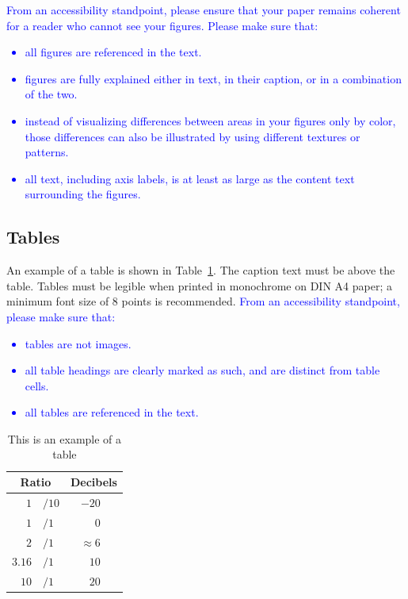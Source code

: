 \documentclass{Interspeech}
\newcommand{\blue}[1]{\textcolor{blue}{#1}}
\begin{document}
\blue{From an accessibility standpoint, please ensure that your paper remains coherent for a reader who cannot see your figures. Please make sure that:
    \begin{itemize}
        \item all figures are referenced in the text.
        \item figures are fully explained either in text, in their caption, or in a combination of the two.
        \item instead of visualizing differences between areas in your figures only by color, those differences can also be illustrated by using different textures or patterns.
        \item all text, including axis labels, is at least as large as the content text surrounding the figures.
    \end{itemize}
}

\subsection{Tables}\label{sec:tables}

An example of a table is shown in Table~\ref{tab:example}. The caption text must be above the table. Tables must be legible when printed in monochrome on DIN A4 paper; a minimum font size of 8 points is recommended. \blue{From an accessibility standpoint, please make sure that:}
    \blue{
    \begin{itemize}
        \item tables are not  images.
        \item all table headings are clearly marked as such, and are distinct from table cells. 
        \item all tables are referenced in the text.
    \end{itemize}
}

\begin{table}[th]
  \caption{This is an example of a table}
  \label{tab:example}
  \centering
  \begin{tabular}{ r@{}l  r }
    \toprule
    \multicolumn{2}{c}{\textbf{Ratio}} & 
                                         \multicolumn{1}{c}{\textbf{Decibels}} \\
    \midrule
    $1$                       & $/10$ & $-20$~~~             \\
    $1$                       & $/1$  & $0$~~~               \\
    $2$                       & $/1$  & $\approx 6$~~~       \\
    $3.16$                    & $/1$  & $10$~~~              \\
    $10$                      & $/1$  & $20$~~~              \\
    \bottomrule
  \end{tabular}
  
\end{table}
\end{document}
